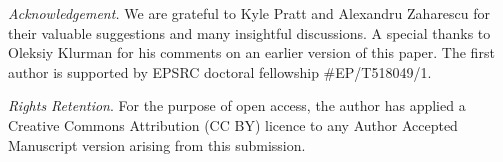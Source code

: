 \documentclass[12pt, oneside,reqno]{amsart}
\numberwithin{equation}{section}
\begin{document}

\medskip

\medskip
\noindent
{\it{Acknowledgement}.} We are grateful to Kyle Pratt and Alexandru Zaharescu for their valuable suggestions and many insightful discussions. A special thanks to Oleksiy Klurman for his comments on an earlier version of this paper. The first author is supported by EPSRC doctoral fellowship \#EP/T518049/1.

\medskip
\noindent
{\it{Rights Retention}}. For the purpose of open access, the author has applied a Creative Commons Attribution (CC BY) licence to any Author Accepted Manuscript version arising from this submission.
\end{document}
